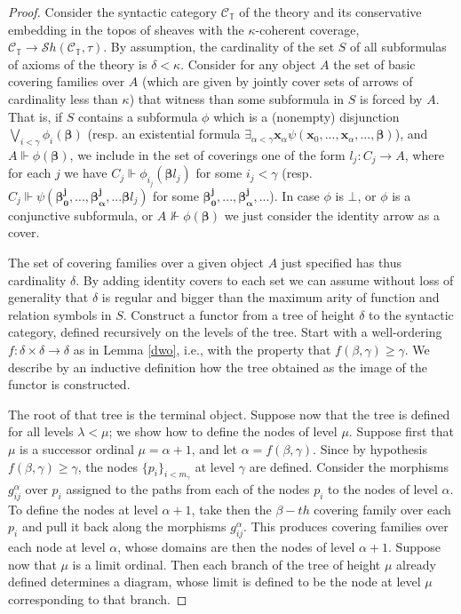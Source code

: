 \documentclass[a4paper,11pt]{article}
\theoremstyle{plain}
\theoremstyle{plain}
\theoremstyle{remark}
\newcommand{\theory}{\ensuremath{\mathbb{T}}}
\begin{document}
\begin{proof}
 Consider the syntactic category $\mathcal{C}_{\theory}$ of the theory and its conservative embedding in the topos of sheaves with the $\kappa$-coherent coverage, $\mathcal{C}_{\theory} \to \mathcal{S}h(\mathcal{C}_{\theory}, \tau)$. By assumption, the cardinality of the set $S$ of all subformulas of axioms of the theory is $\delta<\kappa$. Consider for any object $A$ the set of basic covering families over $A$ (which are given by jointly cover sets of arrows of cardinality less than $\kappa$) that witness than some subformula in $S$ is forced by $A$. That is, if $S$ contains a subformula $\phi$ which is a (nonempty) disjunction $\bigvee_{i<\gamma}\phi_i(\boldsymbol{\beta})$ (resp. an existential formula $\exists_{\alpha<\gamma}\mathbf{x}_{\alpha}\psi(\mathbf{x}_0, ...,\mathbf{x}_{\alpha}, ..., \boldsymbol{\beta})$), and $A \Vdash \phi(\boldsymbol{\beta})$, we include in the set of coverings one of the form $l_j: C_j \to A$, where for each $j$ we have $C_j \Vdash \phi_{i_j}(\boldsymbol{\beta} l_j)$ for some $i_j<\gamma$ (resp. $C_j \Vdash \psi(\boldsymbol{\beta_0^j}, ..., \boldsymbol{\beta_{\alpha}^j}, ... \boldsymbol{\beta} l_j)$ for some $\boldsymbol{\beta_0^j}, ..., \boldsymbol{\beta_{\alpha}^j}, ...$). In case $\phi$ is $\bot$, or $\phi$ is a conjunctive subformula, or $A \nVdash \phi(\boldsymbol{\beta})$ we just consider the identity arrow as a cover.
 
 The set of covering families over a given object $A$ just specified has thus cardinality $\delta$. By adding identity covers to each set we can assume without loss of generality that $\delta$ is regular and bigger than the maximum arity of function and relation symbols in $S$. Construct a functor from a tree of height $\delta$ to the syntactic category, defined recursively on the levels of the tree. Start with a well-ordering $f: \delta \times \delta \to \delta$ as in Lemma \ref{dwo}, i.e.,  with the property that $f(\beta, \gamma) \geq \gamma$. We describe by an inductive definition how the tree obtained as the image of the functor is constructed.
 
 The root of that tree is the terminal object. Suppose now that the tree is defined for all levels $\lambda<\mu$; we show how to define the nodes of level $\mu$. Suppose first that $\mu$ is a successor ordinal $\mu=\alpha+1$, and let $\alpha=f(\beta, \gamma)$. Since by hypothesis $f(\beta, \gamma) \geq \gamma$, the nodes $\{p_i\}_{i<m_{\gamma}}$ at level $\gamma$ are defined. Consider the morphisms $g_{ij}^{\alpha}$ over $p_i$ assigned to the paths from each of the nodes $p_i$ to the nodes of level $\alpha$. To define the nodes at level $\alpha+1$, take then the $\beta-th$ covering family over each $p_i$ and pull it back along the morphisms $g_{ij}^{\alpha}$. This produces covering families over each node at level $\alpha$, whose domains are then the nodes of level $\alpha+1$. Suppose now that $\mu$ is a limit ordinal. Then each branch of the tree of height $\mu$ already defined determines a diagram, whose limit is defined to be the node at level $\mu$ corresponding to that branch. 
 

\end{proof}
\end{document}
